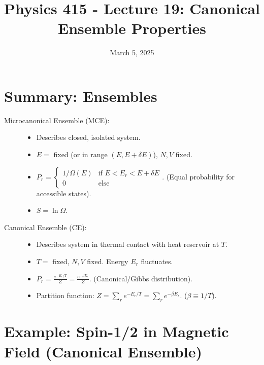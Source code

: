 \documentclass[11pt]{article}
\title{Physics 415 - Lecture 19: Canonical Ensemble Properties}
\date{March 5, 2025}
\author{} %
\newcommand{\deltaE}{\delta E}
\newcommand{\partfn}{Z} %
\begin{document}
\maketitle
\thispagestyle{empty}

\section*{Summary: Ensembles}

\begin{description}
    \item[Microcanonical Ensemble (MCE):]
    \begin{itemize}
        \item Describes closed, isolated system.
        \item $E=$ fixed (or in range $(E, E+\deltaE)$), $N, V$ fixed.
        \item $P_r = \begin{cases} 1/\Omega(E) & \text{if } E < E_r < E+\deltaE \\ 0 & \text{else} \end{cases}$. (Equal probability for accessible states).
        \item $S = \ln \Omega$.
    \end{itemize}

    \item[Canonical Ensemble (CE):]
    \begin{itemize}
        \item Describes system in thermal contact with heat reservoir at $T$.
        \item $T=$ fixed, $N, V$ fixed. Energy $E_r$ fluctuates.
        \item $P_r = \frac{e^{-E_r/T}}{\partfn} = \frac{e^{-\beta E_r}}{\partfn}$. (Canonical/Gibbs distribution).
        \item Partition function: $\partfn = \sum_r e^{-E_r/T} = \sum_r e^{-\beta E_r}$. ($\beta \equiv 1/T$).
    \end{itemize}
\end{description}

\section*{Example: Spin-1/2 in Magnetic Field (Canonical Ensemble)}
\end{document}

